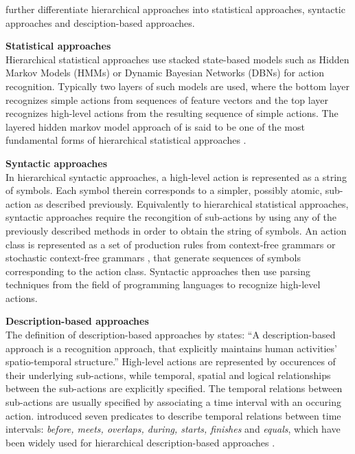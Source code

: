 \textcite{aggarwal_human_2011} further differentiate hierarchical approaches into statistical approaches, syntactic approaches and desciption-based approaches.

\textbf{Statistical approaches} \\
Hierarchical statistical approaches use stacked state-based models such as Hidden Markov Models (HMMs) \cite{oliver_layered_2002}\cite{zhang_modeling_2004} or Dynamic Bayesian Networks (DBNs) \cite{dai_group_2008}\cite{gong_recognition_2003} for action recognition.
Typically two layers of such models are used, where the bottom layer recognizes simple actions from sequences of feature vectors and the top layer recognizes high-level actions from the resulting sequence of simple actions.
The layered hidden markov model approach of \textcite{oliver_layered_2002} is said to be one of the most fundamental forms of hierarchical statistical approaches \cite{aggarwal_human_2011}.

\textbf{Syntactic approaches} \\
In hierarchical syntactic approaches, a high-level action is represented as a string of symbols.
Each symbol therein corresponds to a simpler, possibly atomic, sub-action as described previously.
Equivalently to hierarchical statistical approaches, syntactic approaches require the recongition of sub-actions by using any of the previously described methods in order to obtain the string of symbols.
An action class is represented as a set of production rules from context-free grammars or stochastic context-free grammars \cite{ivanov_recognition_2000}\cite{moore_recognizing_2002}\cite{minnen_expectation_2003}\cite{joo_attribute_2006}, that generate sequences of symbols corresponding to the action class.
Syntactic approaches then use parsing techniques from the field of programming languages \cite{hopcroft_introduction_1979} to recognize high-level actions.

\textbf{Description-based approaches} \\
The definition of description-based approaches by \textcite{aggarwal_human_2011} states: ``A description-based approach is a recognition approach, that explicitly maintains human activities' spatio-temporal structure.''
High-level actions are represented by occurences of their underlying sub-actions, while temporal, spatial and logical relationships between the sub-actions are explicitly specified.
The temporal relations between sub-actions are usually specified by associating a time interval with an occuring action.
\textcite{allen_maintaining_1983}\cite{allen_actions_1994} introduced seven predicates to describe temporal relations between time intervals: \textit{before, meets, overlaps, during, starts, finishes} and \textit{equals}, which have been widely used for hierarchical description-based approaches \cite{pinhanez_human_1998}\cite{siskind_grounding_2001}\cite{nevatia_hierarchical_2003}\cite{ryoo_recognition_2006}.


